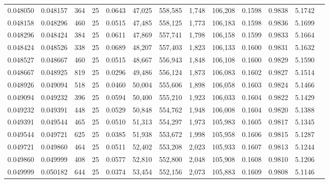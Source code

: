 \begin{tabular}{rrrrrrrrrrrrr}
0.048050 & 0.048157 &   364 &  25 &                                     0.0643 &  47,025 & 558,585 &   1,748 & 106,208 & 0.1598 & 0.9838 & 5.1742 \\
0.048158 & 0.048296 &   460 &  25 &                                     0.0515 &  47,485 & 558,125 &   1,773 & 106,183 & 0.1598 & 0.9836 & 5.1699 \\
0.048296 & 0.048424 &   384 &  25 &                                     0.0611 &  47,869 & 557,741 &   1,798 & 106,158 & 0.1599 & 0.9833 & 5.1664 \\
0.048424 & 0.048526 &   338 &  25 &                                     0.0689 &  48,207 & 557,403 &   1,823 & 106,133 & 0.1600 & 0.9831 & 5.1632 \\
0.048527 & 0.048667 &   460 &  25 &                                     0.0515 &  48,667 & 556,943 &   1,848 & 106,108 & 0.1600 & 0.9829 & 5.1590 \\
0.048667 & 0.048925 &   819 &  25 &                                     0.0296 &  49,486 & 556,124 &   1,873 & 106,083 & 0.1602 & 0.9827 & 5.1514 \\
0.048926 & 0.049094 &   518 &  25 &                                     0.0460 &  50,004 & 555,606 &   1,898 & 106,058 & 0.1603 & 0.9824 & 5.1466 \\
0.049094 & 0.049232 &   396 &  25 &                                     0.0594 &  50,400 & 555,210 &   1,923 & 106,033 & 0.1604 & 0.9822 & 5.1429 \\
0.049232 & 0.049391 &   448 &  25 &                                     0.0529 &  50,848 & 554,762 &   1,948 & 106,008 & 0.1604 & 0.9820 & 5.1388 \\
0.049391 & 0.049544 &   465 &  25 &                                     0.0510 &  51,313 & 554,297 &   1,973 & 105,983 & 0.1605 & 0.9817 & 5.1345 \\
0.049544 & 0.049721 &   625 &  25 &                                     0.0385 &  51,938 & 553,672 &   1,998 & 105,958 & 0.1606 & 0.9815 & 5.1287 \\
0.049721 & 0.049860 &   464 &  25 &                                     0.0511 &  52,402 & 553,208 &   2,023 & 105,933 & 0.1607 & 0.9813 & 5.1244 \\
0.049860 & 0.049999 &   408 &  25 &                                     0.0577 &  52,810 & 552,800 &   2,048 & 105,908 & 0.1608 & 0.9810 & 5.1206 \\
0.049999 & 0.050182 &   644 &  25 &                                     0.0374 &  53,454 & 552,156 &   2,073 & 105,883 & 0.1609 & 0.9808 & 5.1146 \\

\end{tabular}
